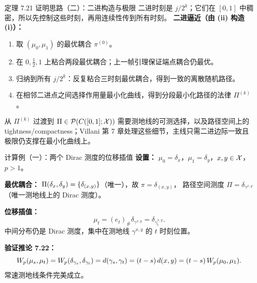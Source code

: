 \begin{frame}{定理 7.21 证明思路（二）：二进构造与极限}
  二进时刻是 $j/2^{k}$；它们在 $[0,1]$ 中稠密，所以先控制这些时刻，再用连续性传到所有时刻。\proofskipnote
  \textbf{二进逼近（由 (ii) 构造 (i)）：}
  \begin{enumerate}
    \item 取 $(\mu_{0},\mu_{1})$ 的最优耦合 $\pi^{(0)}$。
    \item 在 $0,\tfrac{1}{2},1$ 上粘合两段最优耦合；上一帧引理保证端点耦合仍最优。
    \item 归纳到所有 $j/2^{k}$：反复粘合三时刻最优耦合，得到一致的离散随机路径。
    \item 在相邻二进点之间选择作用量最小化曲线，得到分段最小化路径的法律 $\Pi^{(k)}$。
  \end{enumerate}
  从 $\Pi^{(k)}$ 过渡到 $\Pi\in\mathcal{P}(C([0,1];\mathcal{X}))$ 需要测地线的可测选择，以及路径空间上的 tightness/compactness；Villani 第 7 章处理这些细节，主线只需二进边际一致且极限仍支撑在最小化曲线上。
\end{frame}

\begin{frame}{计算例（一）：两个 Dirac 测度的位移插值}
  \textbf{设置：} $\mu_{0}=\delta_{x}$，$\mu_{1}=\delta_{y}$，$x,y\in\mathcal{X}$，$p>1$。

  \textbf{最优耦合：} $\Pi(\delta_{x},\delta_{y})=\{\delta_{(x,y)}\}$（唯一），故 $\pi=\delta_{(x,y)}$，
  路径空间测度 $\Pi=\delta_{\gamma^{x,y}}$（唯一测地线上的 Dirac 测度）。

  \textbf{位移插值：}
  \[
    \mu_{t}=(e_{t})_{\#}\delta_{\gamma^{x,y}}=\delta_{\gamma^{x,y}_{t}}.
  \]
  中间分布仍是 Dirac 测度，集中在测地线 $\gamma^{x,y}$ 的 $t$ 时刻位置。

  \textbf{验证推论 7.22：}
  \[
    W_{p}(\mu_{s},\mu_{t})
    =W_{p}(\delta_{\gamma_{s}},\delta_{\gamma_{t}})
    =d(\gamma_{s},\gamma_{t})
    =(t-s)\,d(x,y)
    =(t-s)\,W_{p}(\mu_{0},\mu_{1}).
  \]
  常速测地线条件完美成立。

\end{frame}

